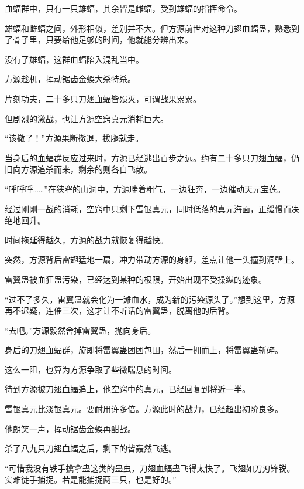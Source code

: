 
\begin{this_body}

血蝠群中，只有一只雄蝠，其余皆是雌蝠，受到雄蝠的指挥命令。

雄蝠和雌蝠之间，外形相似，差别并不大。但方源前世对这种刀翅血蝠蛊，熟悉到了骨子里，只要给他足够的时间，他就能分辨出来。

没有了雄蝠，这群血蝠陷入混乱当中。

方源趁机，挥动锯齿金蜈大杀特杀。

片刻功夫，二十多只刀翅血蝠皆殒灭，可谓战果累累。

但剧烈的激战，也让方源空窍真元消耗巨大。

“该撤了！”方源果断撤退，拔腿就走。

当身后的血蝠群反应过来时，方源已经逃出百步之远。约有二十多只刀翅血蝠，仍旧向方源追杀而来，剩余的则各自飞散。

“呼呼呼……”在狭窄的山洞中，方源喘着粗气，一边狂奔，一边催动天元宝莲。

经过刚刚一战的消耗，空窍中只剩下雪银真元，同时低落的真元海面，正缓慢而决绝地回升。

时间拖延得越久，方源的战力就恢复得越快。

突然，方源背后雷翅猛地一扇，冲力带动方源的身躯，差点让他一头撞到洞壁上。

雷翼蛊被血狂蛊污染，已经达到某种的极限，开始出现不受操纵的迹象。

“过不了多久，雷翼蛊就会化为一滩血水，成为新的污染源头了。”想到这里，方源再不迟疑，连催三次，这才让不听话的雷翼蛊，脱离他的后背。

“去吧。”方源毅然舍掉雷翼蛊，抛向身后。

身后的刀翅血蝠群，旋即将雷翼蛊团团包围，然后一拥而上，将雷翼蛊斩碎。

这么一阻，也算为方源争取了些微喘息的时间。

待到方源被刀翅血蝠追上，他空窍中的真元，已经回复到将近一半。

雪银真元比淡银真元。要耐用许多倍。方源此时的战力，已经超出初阶良多。

他朗笑一声，挥动锯齿金蜈再酣战。

杀了八九只刀翅血蝠之后，剩下的皆轰然飞逃。

“可惜我没有铁手擒拿蛊这类的蛊虫，刀翅血蝠蛊飞得太快了。飞翅如刀刃锋锐。实难徒手捕捉。若是能捕捉两三只，也是好的。”


\end{this_body}
